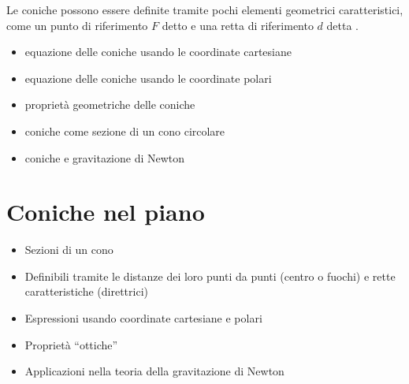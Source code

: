 \documentclass[letterpaper,10pt,english]{jupyterBook}
\begin{document}
\sphinxAtStartPar
Le coniche possono essere definite tramite pochi elementi geometrici caratteristici, come un punto di riferimento \(F\) detto  e una retta di riferimento \(d\) detta .
\begin{itemize}
\item {} 
\sphinxAtStartPar
equazione delle coniche usando le coordinate cartesiane

\item {} 
\sphinxAtStartPar
equazione delle coniche usando le coordinate polari

\item {} 
\sphinxAtStartPar
proprietà geometriche delle coniche

\item {} 
\sphinxAtStartPar
coniche come sezione di un cono circolare

\item {} 
\sphinxAtStartPar
coniche e gravitazione di Newton

\end{itemize}

\sphinxstepscope


\section{Coniche nel piano}
\label{\detokenize{ch/analytic_geometry/analytic_geometry_2d/conics-cartesian:coniche-nel-piano}}\label{\detokenize{ch/analytic_geometry/analytic_geometry_2d/conics-cartesian:geometry-analytic-2d-conics-cartesian}}\label{\detokenize{ch/analytic_geometry/analytic_geometry_2d/conics-cartesian::doc}}\begin{itemize}
\item {} 
\sphinxAtStartPar
Sezioni di un cono

\item {} 
\sphinxAtStartPar
Definibili tramite le distanze dei loro punti da punti (centro o fuochi) e rette caratteristiche (direttrici)

\item {} 
\sphinxAtStartPar
Espressioni usando coordinate cartesiane e polari

\item {} 
\sphinxAtStartPar
Proprietà “ottiche”

\item {} 
\sphinxAtStartPar
Applicazioni nella teoria della gravitazione di Newton

\end{itemize}
\end{document}
